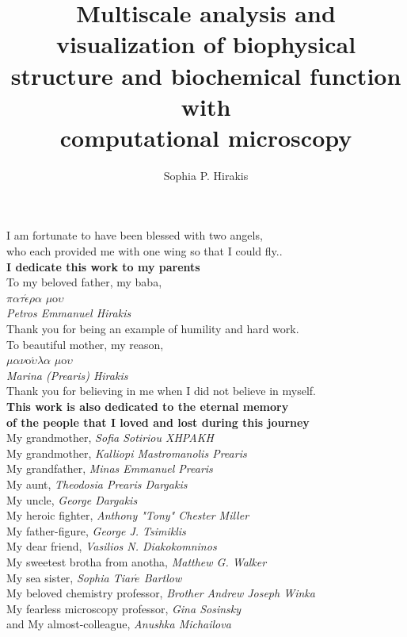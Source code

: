 \documentclass[12pt]{ucsddissertation}
\title{Multiscale analysis and visualization of biophysical structure and biochemical function with\\ computational microscopy}
\author{Sophia P. Hirakis}
\begin{document}
\frontmatter
\maketitle
\makecopyright
\makesignature
\begin{dedication}
\setsinglespacing
\raggedright %
\parindent0pt\parskip\baselineskip
\begin{center}
\vspace{0.5in}
I am fortunate to have been blessed with two angels, \\who each provided me with one wing so that I could fly.. \\
\vspace{0.5in} 
\textbf{I dedicate this work to my parents}
\vspace{0.1in}
\\ To my beloved father, my baba, \\$\pi\alpha\tau\acute{\epsilon}\rho\alpha$ $\mu$o$\upsilon$ \\ \textit{Petros Emmanuel Hirakis} \\Thank you for being an example of humility and hard work. \\ \vspace{0.1in}
To beautiful mother, my reason, \\ $\mu\alpha\nu$o$\acute{\upsilon}\lambda\alpha$  $\mu$o$\upsilon$\\\textit{Marina (Prearis) Hirakis} \\Thank you for believing in me when I did not believe in myself.\\

\vspace{0.5in}
\textbf{This work is also dedicated to the eternal memory \\of the people that I loved and lost during this journey} \\
\vspace{0.1in}
My grandmother, \textit{Sofia Sotiriou XHPAKH}\\
My grandmother, \textit{Kalliopi Mastromanolis Prearis}\\
My grandfather,  \textit{Minas Emmanuel Prearis}\\
My aunt, \textit{Theodosia Prearis Dargakis}\\
My uncle, \textit{George Dargakis}\\
My heroic fighter, \textit{Anthony "Tony" Chester Miller}\\
My father-figure, \textit{George J. Tsimiklis}\\
My dear friend, \textit{Vasilios N. Diakokomninos}\\
My sweetest brotha from anotha, \textit{Matthew G. Walker}\\
My sea sister, \textit{Sophia Tiar$\acute{e}$ Bartlow}\\
My beloved chemistry professor, \textit{Brother Andrew Joseph Winka}\\
My fearless microscopy professor, \textit{Gina Sosinsky}\\
and My almost-colleague, \textit{Anushka Michailova}\\


\end{center}
\end{dedication}
\end{document}
